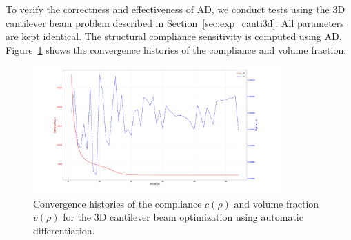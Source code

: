 \documentclass[mathpazo]{cicp}
\begin{document}
To verify the correctness and effectiveness of AD, we conduct tests using the 3D cantilever beam problem described in Section~\ref{sec:exp_canti3d}. All parameters are kept identical. The structural compliance sensitivity is computed using AD. Figure~\ref{fig:canti3d_ad_convergence} shows the convergence histories of the compliance and volume fraction.
\vspace{-2ex} %
\begin{figure}[htp] 
	\centering 
	\includegraphics[width=0.85\textwidth]{figures/cantilever_3d_convergence_auto.png} \caption{Convergence histories of the compliance $c(\rho)$ and volume fraction $v(\rho)$ for the 3D cantilever beam optimization using automatic differentiation.} \label{fig:canti3d_ad_convergence} 
\end{figure}
\vspace{-2ex} %
\end{document}
